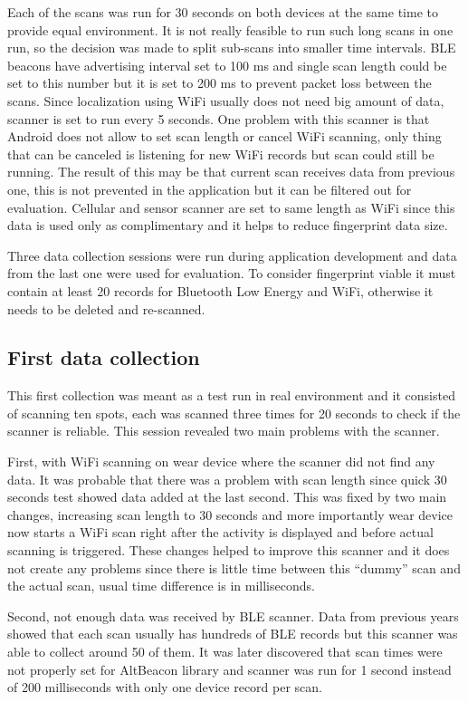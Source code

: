 Each of the scans was run for 30 seconds on both devices at the same time to provide equal environment. It is not really feasible to run such long scans in one run, so the decision was made to split sub-scans into smaller time intervals. BLE beacons have advertising interval set to 100 ms and single scan length could be set to this number but it is set to 200 ms to prevent packet loss between the scans. Since localization using WiFi usually does not need big amount of data, scanner is set to run every 5 seconds. One problem with this scanner is that Android does not allow to set scan length or cancel WiFi scanning, only thing that can be canceled is listening for new WiFi records but scan could still be running. The result of this may be that current scan receives data from previous one, this is not prevented in the application but it can be filtered out for evaluation. Cellular and sensor scanner are set to same length as WiFi since this data is used only as complimentary and it helps to reduce fingerprint data size.

Three data collection sessions were run during application development and data from the last one were used for evaluation. To consider fingerprint viable it must contain at least 20 records for Bluetooth Low Energy and WiFi, otherwise it needs to be deleted and re-scanned.

\subsection{First data collection}\label{sec:FirstDataCollection}
This first collection was meant as a test run in real environment and it consisted of scanning ten spots, each was scanned three times for 20 seconds to check if the scanner is reliable. This session revealed two main problems with the scanner.

First, with WiFi scanning on wear device where the scanner did not find any data. It was probable that there was a problem with scan length since quick 30 seconds test showed data added at the last second. This was fixed by two main changes, increasing scan length to 30 seconds and more importantly wear device now starts a WiFi scan right after the activity is displayed and before actual scanning is triggered. These changes helped to improve this scanner and it does not create any problems since there is little time between this \enquote{dummy} scan and the actual scan, usual time difference is in milliseconds.

Second, not enough data was received by BLE scanner. Data from previous years showed that each scan usually has hundreds of BLE records but this scanner was able to collect around 50 of them. It was later discovered that scan times were not properly set for AltBeacon library and scanner was run for 1 second instead of 200 milliseconds with only one device record per scan.

